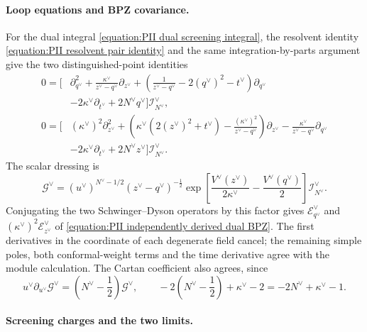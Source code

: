 \documentclass[a4paper,11pt]{article}
\numberwithin{equation}{section}
\begin{document}
\paragraph*{Loop equations and BPZ covariance.}
For the dual integral \eqref{equation:PII dual screening integral},
the resolvent identity \eqref{equation:PII resolvent pair identity}
and the same integration-by-parts argument give
the two distinguished-point identities
\begin{equation}
	\label{equation:PII dual two SD equations}
	\begin{aligned}
		0=\Bigg[&
		\partial_{q^{\vee}}^{2}
		+\frac{\kappa^{\vee}}{z^{\vee}-q^{\vee}}\partial_{z^{\vee}}
		+\left(\frac{1}{z^{\vee}-q^{\vee}}
		-2(q^{\vee})^{2}-t^{\vee}\right)\partial_{q^{\vee}}\\
		&-2\kappa^{\vee}\partial_{t^{\vee}}
		+2N^{\vee}q^{\vee}\Bigg]\mathcal{I}_{N^{\vee}}^{\vee},\\
		0=\Bigg[&
		(\kappa^{\vee})^{2}\partial_{z^{\vee}}^{2}
		+\left(\kappa^{\vee}(2(z^{\vee})^{2}+t^{\vee})
		-\frac{(\kappa^{\vee})^{2}}{z^{\vee}-q^{\vee}}\right)
		\partial_{z^{\vee}}
		-\frac{\kappa^{\vee}}{z^{\vee}-q^{\vee}}\partial_{q^{\vee}}\\
		&-2\kappa^{\vee}\partial_{t^{\vee}}
		+2N^{\vee}z^{\vee}\Bigg]\mathcal{I}_{N^{\vee}}^{\vee}.
	\end{aligned}
\end{equation}
The scalar dressing is
\begin{equation}
	\mathcal{G}^{\vee}
	=(u^{\vee})^{N^{\vee}-1/2}(z^{\vee}-q^{\vee})^{-\frac{1}{2}}
	\exp\left[
	\frac{V^{\vee}(z^{\vee})}{2\kappa^{\vee}}
	-\frac{V^{\vee}(q^{\vee})}{2}\right]
	\mathcal{I}_{N^{\vee}}^{\vee}.
\end{equation}
Conjugating the two Schwinger--Dyson operators by this factor gives
$\mathcal{E}_{q^{\vee}}^{\vee}$ and
$(\kappa^{\vee})^{2}\mathcal{E}_{z^{\vee}}^{\vee}$ of
\eqref{equation:PII independently derived dual BPZ}.  The first derivatives in the coordinate of each degenerate field
cancel; the remaining simple poles, both
conformal-weight terms and the time derivative agree with the
module calculation.  The Cartan coefficient also agrees, since
\begin{equation}
	u^{\vee}\partial_{u^{\vee}}\mathcal{G}^{\vee}
	=\left(N^{\vee}-\frac{1}{2}\right)\mathcal{G}^{\vee},
	\qquad
	-2\left(N^{\vee}-\frac{1}{2}\right)+\kappa^{\vee}-2
	=-2N^{\vee}+\kappa^{\vee}-1.
\end{equation}

\paragraph*{Screening charges and the two limits.}
\end{document}
